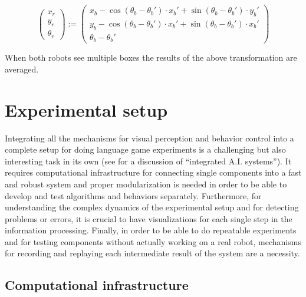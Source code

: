 $$
\begin{pmatrix} x_r \\ y_r \\ \theta_r \end{pmatrix} 
:= 
\begin{pmatrix} 
x_b - \cos(\theta_b - \theta_b') \cdot x_b' + \sin(\theta_b - \theta_b') \cdot y_b'  \\
y_b - \cos(\theta_b - \theta_b') \cdot x_b' + \sin(\theta_b - \theta_b') \cdot x_b'  \\
\theta_b - \theta_b'
\end{pmatrix}
$$

\noindent When both robots see multiple boxes the results of the above
transformation are averaged.



\section{Experimental setup}
\label{s:doing-experiments-with-robots}

Integrating all the mechanisms for visual perception and behavior
control into a complete setup for doing language game experiments is a
challenging but also interesting task in its own (see
\citealp{thorisson07integrated} for a discussion of ``integrated
A.I. systems''). It requires computational infrastructure for
connecting single components into a fast and robust system and proper
modularization is needed in order to be able to develop and test
algorithms and behaviors separately. Furthermore, for understanding
the complex dynamics of the experimental setup and for detecting
problems or errors, it is crucial to have visualizations for each
single step in the information processing. Finally, in order to be
able to do repeatable experiments and for testing components without
actually working on a real robot, mechanisms for recording and
replaying each intermediate result of the system are a necessity.

\subsection{Computational infrastructure}

